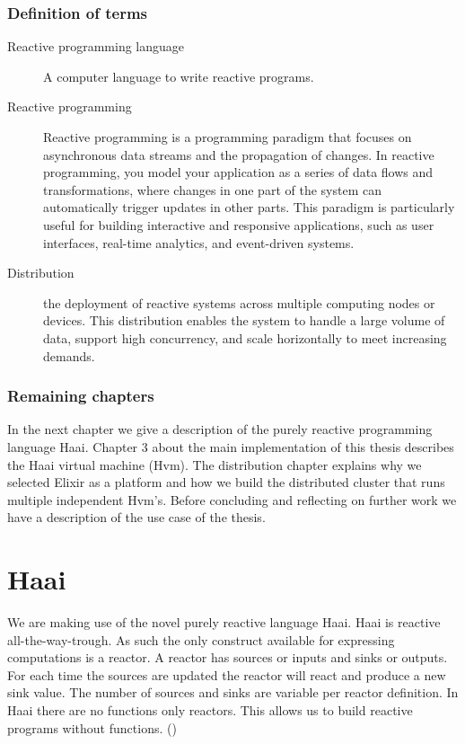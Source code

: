 \documentclass[a4paper]{book}
\begin{document}
\subsection{Definition of terms}
\begin{description}
	\item[Reactive programming language] A computer language to write reactive programs.
	\item[Reactive programming] Reactive programming is a programming paradigm that focuses on asynchronous data streams and the propagation of changes. In reactive programming, you model your application as a series of data flows and transformations, where changes in one part of the system can automatically trigger updates in other parts. This paradigm is particularly useful for building interactive and responsive applications, such as user interfaces, real-time analytics, and event-driven systems.
	\item[Distribution] the deployment of reactive systems across multiple computing nodes or devices. This distribution enables the system to handle a large volume of data, support high concurrency, and scale horizontally to meet increasing demands.
\end{description}


\subsection{Remaining chapters}
In the next chapter we give a description of the purely reactive programming language Haai. Chapter 3 about the main implementation of this thesis describes the Haai virtual machine (Hvm). The distribution chapter explains why we selected Elixir as a platform and how we build the distributed cluster that runs multiple independent Hvm's. Before concluding and reflecting on further work we have a description of the use case of the thesis. 


\chapter{Haai}
We are making use of the novel purely reactive language Haai. Haai is reactive all-the-way-trough. As such the only construct available for expressing computations is a reactor. A reactor has sources or inputs and sinks or outputs. For each time the sources are updated the reactor will react and produce a new sink value. The number of sources and sinks are variable per reactor definition. In Haai there are no functions only reactors. This allows us to build reactive programs without functions. (\cite{oeyen_reactive_2024})
\end{document}
